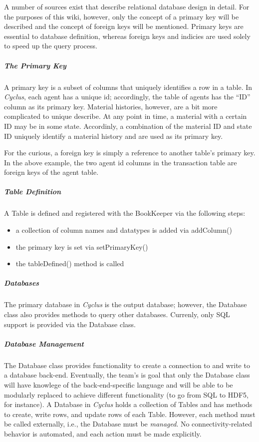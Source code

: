 \documentclass[letterpaper,10pt,english]{sphinxmanual}
\begin{document}
A number of sources exist that describe relational database design in detail. For the purposes
of this wiki, however, only the concept of a primary key will be described and the concept of
foreign keys will be mentioned. Primary keys are essential to database definition, whereas foreign
keys and indicies are used solely to speed up the query process.


\subparagraph{The Primary Key}
\label{devdoc/output_dbase:the-primary-key}
A primary key is a subset of columns that uniquely identifies a row in a table. In \emph{Cyclus}, each
agent has a unique id; accordingly, the table of agents has the ``ID'' column as its primary key.
Material histories, however, are a bit more complicated to unique describe. At any point in time, a
material with a certain ID may be in some state. Accordinly, a combination of the material ID and state
ID uniquely identify a material history and are used as its primary key.

For the curious, a foreign key is simply a reference to another table's primary key. In the above
example, the two agent id columns in the transaction table are foreign keys of the agent table.


\subparagraph{Table Definition}
\label{devdoc/output_dbase:table-definition}
A Table is defined and registered with the BookKeeper via the following steps:
\begin{itemize}
\item {} 
a collection of column names and datatypes is added via addColumn()

\item {} 
the primary key is set via setPrimaryKey()

\item {} 
the tableDefined() method is called

\end{itemize}


\subparagraph{Databases}
\label{devdoc/output_dbase:databases}
The primary database in \emph{Cyclus} is the output database; however, the Database class also provides
methods to query other databases. Currenly, only SQL support is provided via the Database class.


\subparagraph{Database Management}
\label{devdoc/output_dbase:database-management}
The Database class provides functionality to create a connection to and write to a database back-end.
Eventually, the team's is goal that only the Database class will have knowlege of the back-end-specific language
and will be able to be modularly replaced to achieve different functionality (to go from SQL to
HDF5, for instance). A Database in \emph{Cyclus} holds a collection of Tables and has methods to
create, write rows, and update rows of each Table. However, each method must be called
externally, i.e., the Database must be \emph{managed}. No connectivity-related behavior is automated, and
each action must be made explicitly.
\end{document}
